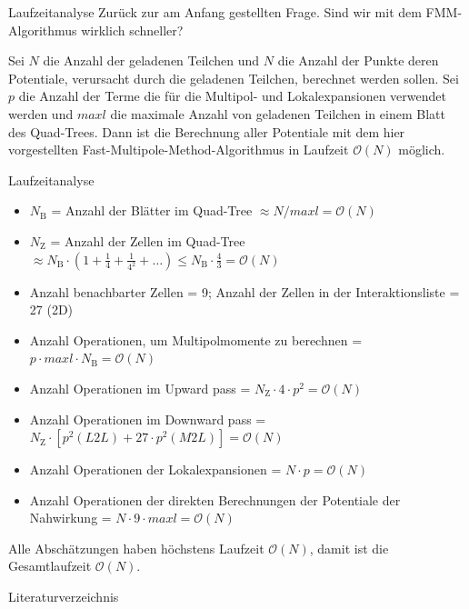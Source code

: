 \documentclass[ngerman]{beamer}
\begin{document}
\begin{frame}{Laufzeitanalyse}
Zurück zur am Anfang gestellten Frage. Sind wir mit dem FMM-Algorithmus wirklich schneller?
\begin{Satz}
Sei $N$ die Anzahl der geladenen Teilchen und $N$ die Anzahl der Punkte deren Potentiale, verursacht durch die geladenen Teilchen, berechnet werden sollen. Sei $p$ die Anzahl der Terme die für die Multipol- und Lokalexpansionen verwendet werden und $maxl$ die maximale Anzahl von geladenen Teilchen in einem Blatt des Quad-Trees. Dann ist die Berechnung aller Potentiale mit dem hier vorgestellten Fast-Multipole-Method-Algorithmus in Laufzeit $\mathcal{O}(N)$ möglich.
\end{Satz}
\end{frame}

\begin{frame}{Laufzeitanalyse}
\begin{Beweis}
\footnotesize
\begin{itemize}
\item $N_\text{B}$ = Anzahl der Blätter im Quad-Tree $\approx N/maxl = \mathcal{O}(N)$
\item $N_\text{Z}$ = Anzahl der Zellen im Quad-Tree $\approx N_\text{B}\cdot(1+\frac{1}{4} + \frac{1}{4^2} + \ldots) \leq N_\text{B} \cdot \frac{4}{3} = \mathcal{O}(N)$
\item Anzahl benachbarter Zellen = 9; Anzahl der Zellen in der Interaktionsliste = 27 (2D)
\item Anzahl Operationen, um Multipolmomente zu berechnen = $p\cdot maxl \cdot N_\text{B} = \mathcal{O}(N)$
\item Anzahl Operationen im Upward pass = $N_\text{Z}\cdot 4 \cdot p^2 = \mathcal{O}(N)$
\item Anzahl Operationen im Downward pass = $N_\text{Z}\cdot \left[p^2 (L2L) + 27 \cdot p^2(M2L) \right] = \mathcal{O}(N)$
\item Anzahl Operationen der Lokalexpansionen = $N \cdot p = \mathcal{O}(N)$
\item Anzahl Operationen der direkten Berechnungen der Potentiale der Nahwirkung = $N\cdot 9\cdot maxl = \mathcal{O}(N)$
\end{itemize}
Alle Abschätzungen haben höchstens Laufzeit $\mathcal{O}(N)$, damit ist die Gesamtlaufzeit $\mathcal{O}(N)$.
\end{Beweis}
\end{frame}

\begin{frame}{Literaturverzeichnis}
\nocite{*}


\end{frame}
\end{document}
